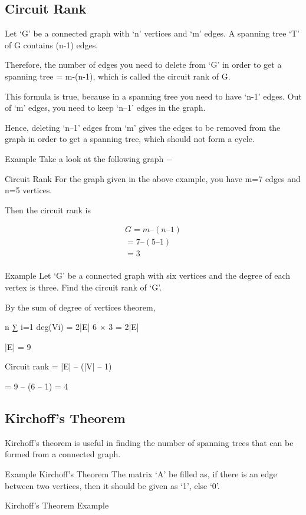 \subsection{Circuit Rank}
Let ‘G’ be a connected graph with ‘n’ vertices and ‘m’ edges. A spanning tree ‘T’ of G contains (n-1) edges.

Therefore, the number of edges you need to delete from ‘G’ in order to get a spanning tree = m-(n-1), which is called the circuit rank of G.

This formula is true, because in a spanning tree you need to have ‘n-1’ edges. Out of ‘m’ edges, you need to keep ‘n–1’ edges in the graph.

Hence, deleting ‘n–1’ edges from ‘m’ gives the edges to be removed from the graph in order to get a spanning tree, which should not form a cycle.

Example
Take a look at the following graph −

Circuit Rank
For the graph given in the above example, you have m=7 edges and n=5 vertices.

Then the circuit rank is

\begin{eqnarray}
G = m – (n – 1)\\
  = 7 – (5 – 1)\\
  = 3\\
\end{eqnarray}

Example
Let ‘G’ be a connected graph with six vertices and the degree of each vertex is three. Find the circuit rank of ‘G’.

By the sum of degree of vertices theorem,

n
∑
i=1
 deg(Vi) = 2|E|
6 × 3 = 2|E|

|E| = 9

Circuit rank = |E| – (|V| – 1)

= 9 – (6 – 1) = 4

\subsection{Kirchoff’s Theorem}
Kirchoff’s theorem is useful in finding the number of spanning trees that can be formed from a connected graph.

Example
Kirchoff’s Theorem
The matrix ‘A’ be filled as, if there is an edge between two vertices, then it should be given as ‘1’, else ‘0’.

Kirchoff’s Theorem Example


\newpage




